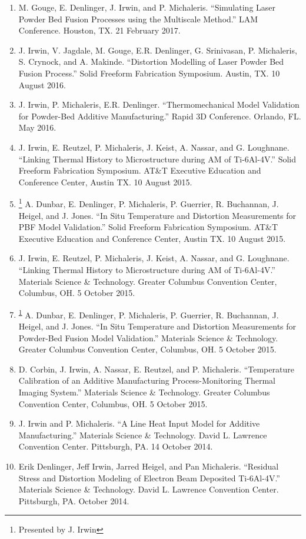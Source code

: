 \documentclass[10.5pt,letterpaper]{article}
\begin{document}
\begin{enumerate}[leftmargin=*]
	\item M. Gouge, E. Denlinger, J. Irwin, and P. Michaleris.  ``Simulating Laser Powder Bed Fusion Processes using the Multiscale Method.''  LAM Conference.  Houston, TX.  21 February 2017.
	\item J. Irwin, V. Jagdale, M. Gouge, E.R. Denlinger, G. Srinivasan, P. Michaleris, S. Crynock, and A. Makinde.  ``Distortion Modelling of Laser Powder Bed Fusion Process.''  Solid Freeform Fabrication Symposium.  Austin, TX.  10 August 2016.
	\item J. Irwin, P. Michaleris, E.R. Denlinger.  ``Thermomechanical Model Validation for Powder-Bed Additive Manufacturing.''  Rapid 3D Conference.  Orlando, FL.  May 2016.
	\item J. Irwin, E. Reutzel, P. Michaleris, J. Keist, A. Nassar, and G. Loughnane. ``Linking Thermal History to Microstructure during AM of Ti-6Al-4V.'' Solid Freeform Fabrication Symposium. AT\&T Executive Education and Conference Center, Austin TX. 10 August 2015.
	\item \footnote{\label{note1}Presented by J. Irwin} A. Dunbar, E. Denlinger, P. Michaleris, P. Guerrier, R. Buchannan, J. Heigel, and J. Jones. ``In Situ Temperature and Distortion Measurements for PBF Model Validation.'' Solid Freeform Fabrication Symposium. AT\&T Executive Education and Conference Center, Austin TX. 10 August 2015.
	\item J. Irwin, E. Reutzel, P. Michaleris, J. Keist, A. Nassar, and G. Loughnane. ``Linking Thermal History to Microstructure during AM of Ti-6Al-4V.'' Materials Science \& Technology. Greater Columbus Convention Center, Columbus, OH. 5 October 2015.
	\item \textsuperscript{\ref{note1}} A. Dunbar, E. Denlinger, P. Michaleris, P. Guerrier, R. Buchannan, J. Heigel, and J. Jones. ``In Situ Temperature and Distortion Measurements for Powder-Bed Fusion Model Validation.'' Materials Science \& Technology. Greater Columbus Convention Center, Columbus, OH. 5 October 2015.
	\item D. Corbin, J. Irwin, A. Nassar, E. Reutzel, and P. Michaleris. ``Temperature Calibration of an Additive Manufacturing Process-Monitoring Thermal Imaging System.'' Materials Science \& Technology. Greater Columbus Convention Center, Columbus, OH. 5 October 2015.
	\item J. Irwin and P. Michaleris. ``A Line Heat Input Model for Additive Manufacturing.'' Materials Science \& Technology. David L. Lawrence Convention Center. Pittsburgh, PA. 14 October 2014.
	\item Erik Denlinger, Jeff Irwin, Jarred Heigel, and Pan Michaleris.  ``Residual Stress and Distortion Modeling of Electron Beam Deposited Ti-6Al-4V.''  Materials Science \& Technology.  David L. Lawrence Convention Center.  Pittsburgh, PA.  October 2014.
\end{enumerate}
\end{document}
